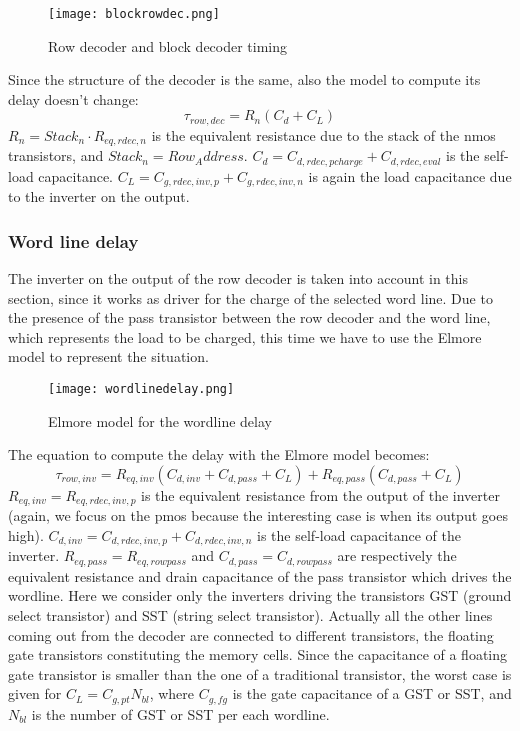 \begin{center}
	\begin{figure}[H]
		\centering
		\texttt{[image: blockrowdec.png]}
		\caption{Row decoder and block decoder timing}
	\end{figure}
\end{center}

Since the structure of the decoder is the same, also the model to compute its delay doesn't change:
$$\tau_{row,dec}=R_n(C_d+C_L)$$
$R_n=Stack_n\cdot R_{eq,rdec,n}$ is the equivalent resistance due to the stack of the nmos transistors, and $Stack_n=Row_Address$. $C_d=C_{d,rdec,pcharge}+C_{d,rdec,eval}$ is the self-load capacitance. $C_L=C_{g,rdec,inv,p}+C_{g,rdec,inv,n}$ is again the load capacitance due to the inverter on the output.

\subsubsection{Word line delay}
The inverter on the output of the row decoder is taken into account in this section, since it works as driver for the charge of the selected word line. Due to the presence of the pass transistor between the row decoder and the word line, which represents the load to be charged, this time we have to use the Elmore model to represent the situation.

\begin{center}
	\begin{figure}[H]
		\centering
		\texttt{[image: wordlinedelay.png]}
		\caption{Elmore model for the wordline delay}
	\end{figure}
\end{center}

The equation to compute the delay with the Elmore model becomes:
$$\tau_{row,inv}=R_{eq,inv}(C_{d,inv}+C_{d,pass}+C_L)+R_{eq,pass}(C_{d,pass}+C_L)$$
$R_{eq,inv}=R_{eq,rdec,inv,p}$ is the equivalent resistance from the output of the inverter (again, we focus on the pmos because the interesting case is when its output goes high). $C_{d,inv}=C_{d,rdec,inv,p}+C_{d,rdec,inv,n}$ is the self-load capacitance of the inverter. $R_{eq,pass}=R_{eq,rowpass}$ and $C_{d,pass}=C_{d,rowpass}$ are respectively the equivalent resistance and drain capacitance of the pass transistor which drives the wordline. Here we consider only the inverters driving the transistors GST (ground select transistor) and SST (string select transistor). Actually all the other lines coming out from the decoder are connected to different transistors, the floating gate transistors constituting the memory cells. Since the capacitance of a floating gate transistor is smaller than the one of a traditional transistor, the worst case is given for $C_L=C_{g,pt}N_{bl}$, where $C_{g,fg}$ is the gate capacitance of a GST or SST, and $N_{bl}$ is the number of GST or SST per each wordline. 



